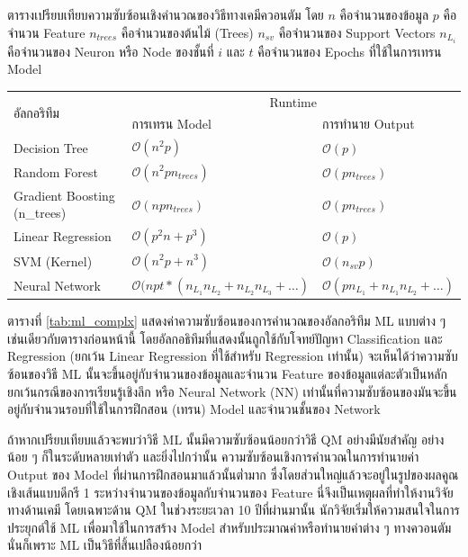 \begin{adjustwidth}{-2.5 cm}{-2.5 cm}
    \centering
    \begin{threeparttable}[H]
    \caption{ตารางเปรียบเทียบความซับซ้อนเชิงคำนวณของวิธีทางเคมีควอนตัม\cite{zotero-328} โดย $n$ คือจำนวนของข้อมูล $p$ คือจำนวน Feature
    $n_{trees}$ คือจำนวนของต้นไม้ (Trees) $n_{sv}$ คือจำนวนของ Support Vectors $n_{L_{i}}$ คือจำนวนของ Neuron หรือ Node ของชั้นที่ $i$
    และ $t$ คือจำนวนของ Epochs ที่ใช้ในการเทรน Model}
    \label{tab:ml_complx}
    \small
    \begin{tabular}{lll}\toprule
    \multirow{2}{*}{อัลกอริทึม} &\multicolumn{2}{c}{Runtime} \\\cmidrule{2-3}
    &การเทรน Model &การทำนาย Output \\\midrule
    Decision Tree &$\mathcal{O}(n^{2}p)$ &$\mathcal{O}(p)$ \\
    Random Forest &$\mathcal{O}(n^{2}pn_{trees})$ &$\mathcal{O}(pn_{trees})$ \\
    Gradient Boosting (n\_{trees}) &$\mathcal{O}(npn_{trees})$ &$\mathcal{O}(pn_{trees})$ \\
    Linear Regression &$\mathcal{O}(p^{2}n+p^{3})$ &$\mathcal{O}(p)$ \\
    SVM (Kernel) &$\mathcal{O}(n^{2}p+n^{3})$ &$\mathcal{O}(n_{sv}p)$ \\
    Neural Network &$\mathcal{O}(npt*(n_{L_{1}}n_{L_{2}}+ n_{L_{2}}n_{L_{3}} + \dots)$ &$\mathcal{O}(pn_{L_{1}}+n_{L_{1}}n_{L_{2}}+ \dots)$ \\
    \bottomrule
    \end{tabular}
\end{threeparttable}
\end{adjustwidth}

ตารางที่ \ref{tab:ml_complx} แสดงค่าความซับซ้อนของการคำนวณของอัลกอริทึม ML แบบต่าง ๆ เช่นเดียวกับตารางก่อนหน้านี้ 
โดยอัลกอธิทึมที่แสดงนั้นถูกใช้กับโจทย์ปัญหา Classification และ Regression (ยกเว้น Linear Regression ที่ใช้สำหรับ Regression เท่านั้น)
จะเห็นได้ว่าความซับซ้อนของวิธี ML นั้นจะขึ้นอยู่กับจำนวนของข้อมูลและจำนวน Feature ของข้อมูลแต่ละตัวเป็นหลัก ยกเว้นกรณีของการเรียนรู้เชิงลึก 
หรือ Neural Network (NN) เท่านั้นที่ความซับซ้อนของมันจะขึ้นอยู่กับจำนวนรอบที่ใช้ในการฝึกสอน (เทรน) Model และจำนวนชั้นของ Network

ถ้าหากเปรียบเทียบแล้วจะพบว่าวิธี ML นั้นมีความซับซ้อนน้อยกว่าวิธี QM อย่างมีนัยสำคัญ อย่างน้อย ๆ ก็ในระดับหลายเท่าตัว และยิ่งไปกว่านั้น
ความซับซ้อนเชิงการคำนวณในการทำนายค่า Output ของ Model ที่ผ่านการฝึกสอนมาแล้วนั้นต่ำมาก ซึ่งโดยส่วนใหญ่แล้วจะอยู่ในรูปของผลคูณเชิงเส้นแบบดีกรี 1 
ระหว่างจำนวนของข้อมูลกับจำนวนของ Feature นี่จึงเป็นเหตุผลที่ทำให้งานวิจัยทางด้านเคมี โดยเฉพาะด้าน QM ในช่วงระยะเวลา 10 ปีที่ผ่านมานั้น 
นักวิจัยเริ่มให้ความสนใจในการประยุกต์ใช้ ML เพื่อมาใช้ในการสร้าง Model สำหรับประมาณค่าหรือทำนายค่าต่าง ๆ ทางควอนตัม นั่นก็เพราะ ML เป็นวิธีที่สิ้นเปลืองน้อยกว่า


